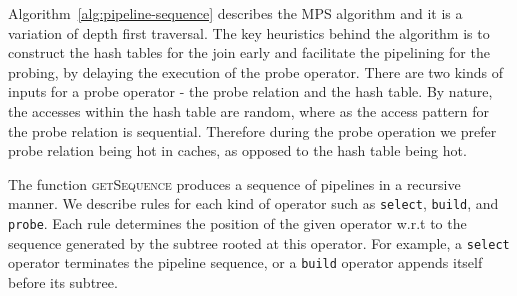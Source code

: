 Algorithm~\ref{alg:pipeline-sequence} describes the MPS algorithm and it is a variation of depth first traversal. 
The key heuristics behind the algorithm is to construct the hash tables for the join early and facilitate the pipelining for the probing, by delaying the execution of the probe operator.
There are two kinds of inputs for a probe operator - the probe relation and the hash table.
By nature, the accesses within the hash table are random, where as the access pattern for the probe relation is sequential. 
Therefore during the probe operation we prefer probe relation being hot in caches, as opposed to the hash table being hot.

The function \textsc{getSequence} produces a sequence of pipelines in a recursive manner.
We describe rules for each kind of operator such as \texttt{select}, \texttt{build}, and \texttt{probe}.
Each rule determines the position of the given operator w.r.t to the sequence generated by the subtree rooted at this operator.
For example, a \texttt{select} operator terminates the pipeline sequence, or a \texttt{build} operator appends itself before its subtree.

